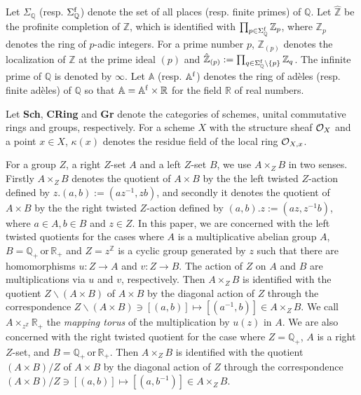 \documentclass[12pt, leqno]{article}
\begin{document}
Let $\Sigma_{\mathbb{Q}}$ (resp. $\Sigma_{\mathbb{Q}}^{\rm f}$) denote the set of all places (resp. finite primes)  of $\mathbb{Q}$. Let $\hat{\mathbb{Z}}$ be the profinite completion of $\mathbb{Z}$, which is identified with $\prod_{p  \in \Sigma_{\mathbb{Q}}^{\rm f}}\mathbb{Z}_p$, where $\mathbb{Z}_p$ denotes the ring of  $p$-adic integers. For a prime number $p$, $\mathbb{Z}_{(p)}$ denotes the localization of $\mathbb{Z}$ at the prime ideal $(p)$ and $\hat{\mathbb{Z}}_{(p)} := \prod_{q \in \Sigma_{\mathbb{Q}}^{\rm f} \setminus \{ p \}} \mathbb{Z}_q$. The infinite prime of $\mathbb{Q}$ is denoted by $\infty$. Let $\mathbb{A}$ (resp. $\mathbb{A}^{\rm f}$) denotes the ring of ad\`{e}les (resp. finite ad\`{e}les) of $\mathbb{Q}$ so that $\mathbb{A} = \mathbb{A}^{\rm f} \times \mathbb{R}$ for the field $\mathbb{R}$ of real numbers. 
 
Let  {\bf Sch},  {\bf CRing} and {\bf Gr} denote  the categories of schemes, unital commutative  rings and groups, respectively. For a scheme $X$ with the structure sheaf ${\cal O}_X$ and a point $x \in X$,  $\kappa(x)$ denotes the residue field of the local ring ${\cal O}_{X,x}$.

For a group $Z$, a right $Z$-set $A$ and a left $Z$-set $B$, we use $A \times_{Z} B$ in two senses. Firstly $A \times_Z B$ denotes the quotient of $A \times B$ by the the left twisted $Z$-action defined by $z.(a,b) := (az^{-1}, zb)$, and secondly it denotes the quotient of  $A \times B$ by the the right twisted $Z$-action defined by $(a,b).z := (az, z^{-1} b)$, where $a \in A, b \in B$ and $z \in Z$. In this paper, we are concerned with the left twisted quotients for the cases where  
$A$ is a multiplicative abelian group $A$, $B = \mathbb{Q}_+ \, \mbox{or}\, \mathbb{R}_+$ and $Z = z^{\mathbb{Z}}$ is  a cyclic group   generated by $z$ such that there are homomorphisms $u : Z \rightarrow A$ and $v : Z \rightarrow B$. The action of $Z$ on $A$ and $B$ are multiplications via $u$ and $v$, respectively. Then $A \times_Z B$ is identified with the quotient
$Z\backslash (A \times B)$ of $A \times B$ by the diagonal action of $Z$ through the correspondence $Z\backslash(A \times B) \ni [(a,b)] \mapsto [(a^{-1},b)] \in A \times_Z B$.  We call $A \times_{z^{\mathbb{Z}}} \mathbb{R}_+$ the {\it mapping torus} of the multiplication by $u(z)$ in $A$. We are also concerned with the right twisted quotient for the case where $Z = \mathbb{Q}_+$, $A$ is a right $Z$-set, and $B = \mathbb{Q}_+ \, \mbox{or}\, \mathbb{R}_+$. Then $A \times_Z B$ is identified with the quotient $ (A \times B)/Z$ of $A \times B$ by the diagonal action of $Z$ through the correspondence $(A \times B)/Z \ni [(a,b)] \mapsto [(a,b^{-1})] \in A \times_Z B$. \\
\end{document}
